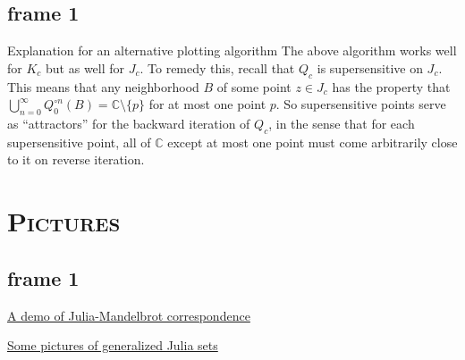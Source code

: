 \documentclass[xcolor=x11names,compress]{beamer}
\renewcommand{\(}{\begin{columns}}
\renewcommand{\)}{\end{columns}}
\newcommand{\<}[1]{\begin{column}{#1}}
\renewcommand{\>}{\end{column}}
\begin{document}
\subsection{frame 1}
\begin{frame}
Explanation for an alternative plotting algorithm
\vspace{.4cm}
The above algorithm works well for $K_c$ but as well for $J_c$.
To remedy this, recall that $Q_c$ is supersensitive on $J_c$.
This means that any neighborhood $B$ of some point $z\in J_c$ has
the property that
$\bigcup_{n=0}^\infty Q_0^{\circ n} (B) = \mathbb{C} \setminus \{p\}$ for at most one point $p$.
\vspace{.4cm}
So supersensitive points serve as ``attractors'' for the backward iteration of $Q_c$,
in the sense that for each supersensitive point, all of $\mathbb{C}$ except at most one point
must come arbitrarily close to it on reverse iteration.
\end{frame}
\section{\scshape Pictures}
\subsection{frame 1}
\begin{frame}
\begin{itemize}
{\color{DeepSkyBlue4}
\item \href{http://demonstrations.wolfram.com/JuliaSetsAndTheMandelbrotSet/}{A demo of Julia-Mandelbrot correspondence}
}
\end{itemize}
\vspace{.4cm}
\begin{itemize}
{\color{DeepSkyBlue4}
\item \href{http://www.juliasets.dk/UFP.htm}{Some pictures of generalized Julia sets}
}
\end{itemize}
\end{frame}
\end{document}
